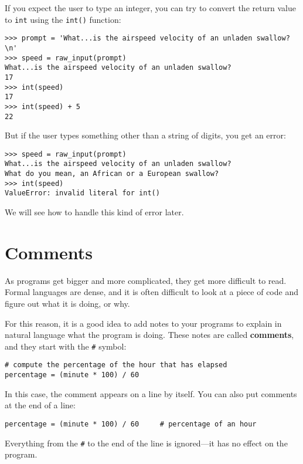 \begin{ex}

If you expect the user to type an integer, you can try to convert
the return value to {\tt int} using the {\tt int()} function:

\beforeverb
\begin{verbatim}
>>> prompt = 'What...is the airspeed velocity of an unladen swallow?\n'
>>> speed = raw_input(prompt)
What...is the airspeed velocity of an unladen swallow?
17
>>> int(speed)
17
>>> int(speed) + 5
22
\end{verbatim}
\afterverb
%
But if the user types something other than a string of digits,
you get an error:

\beforeverb
\begin{verbatim}
>>> speed = raw_input(prompt)
What...is the airspeed velocity of an unladen swallow?
What do you mean, an African or a European swallow?
>>> int(speed)
ValueError: invalid literal for int()
\end{verbatim}
\afterverb
%
We will see how to handle this kind of error later.



\section{Comments}

As programs get bigger and more complicated, they get more difficult
to read.  Formal languages are dense, and it is often difficult to
look at a piece of code and figure out what it is doing, or why.

For this reason, it is a good idea to add notes to your programs to explain
in natural language what the program is doing.  These notes are called
{\bf comments}, and they start with the \verb"#" symbol:

\beforeverb
\begin{verbatim}
# compute the percentage of the hour that has elapsed
percentage = (minute * 100) / 60
\end{verbatim}
\afterverb
%
In this case, the comment appears on a line by itself.  You can also put
comments at the end of a line:

\beforeverb
\begin{verbatim}
percentage = (minute * 100) / 60     # percentage of an hour
\end{verbatim}
\afterverb
%
Everything from the {\tt \#} to the end of the line is ignored---it
has no effect on the program.


\end{ex}
